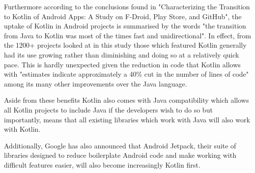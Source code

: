 Furthermore according to the conclusions found in "Characterizing the Transition to Kotlin of Android Apps: A Study on F-Droid, Play Store, and GitHub"\cite{androidkotlinstudy}, the uptake of Kotlin in Android projects is summarised by the words "the transition from Java to Kotlin was most of the times fast and unidirectional"\cite{androidkotlinuptake}. In effect, from the 1200+ projects looked at in this study those which featured Kotlin generally had its use growing rather than diminishing and doing so at a relatively quick pace. This is hardly unexpected given the reduction in code that Kotlin allows with "estimates indicate approximately a 40\% cut in the number of lines of code"\cite{kotlinlesscode} among its many other improvements over the Java language.

Aside from these benefits Kotlin also comes with Java compatibility which allows all Kotlin projects to include Java if the developers wish to do so but importantly, means that all existing libraries which work with Java will also work with Kotlin\cite{androidkotlindevbookkotlinjavacompat}.

Additionally, Google has also announced that Android Jetpack, their suite of libraries designed to reduce boilerplate Android code and make working with difficult features easier\cite{androidjetpackref}, will also become increasingly Kotlin first\cite{googlekotlinfirstref}\cite{androidkotlindevbookkotlinfirst}.



